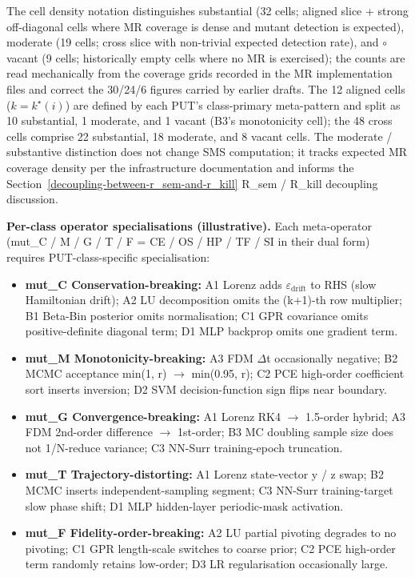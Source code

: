 \documentclass[manuscript,screen,review]{acmart}
\begin{document}
The cell density notation distinguishes \textbullet\textbullet substantial (32 cells;
aligned slice + strong off-diagonal cells where MR coverage is dense and
mutant detection is expected), \textbullet moderate (19 cells; cross slice with
non-trivial expected detection rate), and $\circ$ vacant (9 cells;
historically empty cells where no MR is exercised); the counts are
read mechanically from the coverage grids recorded in the MR
implementation files and correct the 30/24/6 figures carried by
earlier drafts. The 12
aligned cells ($k = k^\star(i)$) are defined by each PUT's class-primary
meta-pattern and split as 10 substantial, 1 moderate, and 1 vacant
(B3's monotonicity cell); the 48 cross
cells comprise 22 substantial, 18 moderate, and 8
vacant cells. The \textbullet moderate / \textbullet\textbullet substantive
distinction does not change SMS computation; it tracks expected MR
coverage density per the infrastructure documentation and informs the Section~\ref{decoupling-between-r_sem-and-r_kill} R\_sem /
R\_kill decoupling discussion.

\textbf{Per-class operator specialisations (illustrative).} Each
meta-operator (mut\_C / M / G / T / F = CE / OS / HP / TF / SI in their
dual form) requires PUT-class-specific specialisation:

\begin{itemize}

\item
  \textbf{mut\_C Conservation-breaking:} A1 Lorenz adds $\varepsilon_{\mathrm{drift}}$ to RHS
  (slow Hamiltonian drift); A2 LU decomposition omits the (k+1)-th row
  multiplier; B1 Beta-Bin posterior omits normalisation; C1 GPR
  covariance omits positive-definite diagonal term; D1 MLP backprop
  omits one gradient term.
\item
  \textbf{mut\_M Monotonicity-breaking:} A3 FDM $\Delta$t occasionally
  negative; B2 MCMC acceptance min(1, r) $\to$ min(0.95, r); C2 PCE
  high-order coefficient sort inserts inversion; D2 SVM
  decision-function sign flips near boundary.
\item
  \textbf{mut\_G Convergence-breaking:} A1 Lorenz RK4 $\to$ 1.5-order
  hybrid; A3 FDM 2nd-order difference $\to$ 1st-order; B3 MC doubling sample
  size does not 1/N-reduce variance; C3 NN-Surr training-epoch
  truncation.
\item
  \textbf{mut\_T Trajectory-distorting:} A1 Lorenz state-vector y / z
  swap; B2 MCMC inserts independent-sampling segment; C3 NN-Surr
  training-target slow phase shift; D1 MLP hidden-layer periodic-mask
  activation.
\item
  \textbf{mut\_F Fidelity-order-breaking:} A2 LU partial pivoting
  degrades to no pivoting; C1 GPR length-scale switches to coarse prior;
  C2 PCE high-order term randomly retains low-order; D3 LR
  regularisation occasionally large.
\end{itemize}
\end{document}
